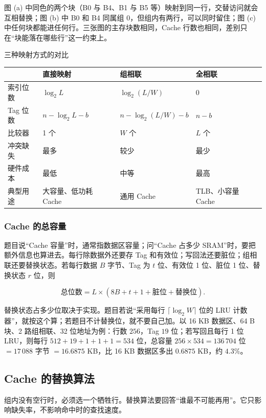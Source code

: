 图 (a) 中同色的两个块（B0 与 B4、B1 与 B5 等）映射到同一行，交替访问就会互相替换；图 (b) 中 B0 和 B4 同属组 0，但组内有两行，可以同时留住；图 (c) 中任何块都能进任何行。三张图的主存块数相同，Cache 行数也相同，差别只在“块能落在哪些行”这一约束上。

\begin{tablebox}{三种映射方式的对比}
\centering
\begin{tabularx}{\linewidth}{|p{2.1cm}|X|X|X|}
\hline
 & 直接映射 & 组相联 & 全相联 \\
\hline
索引位数 & \(\log_2 L\) & \(\log_2(L/W)\) & 0 \\
Tag 位数 & \(n-\log_2 L-b\) & \(n-\log_2(L/W)-b\) & \(n-b\) \\
比较器 & 1 个 & \(W\) 个 & \(L\) 个 \\
冲突缺失 & 最多 & 较少 & 最少 \\
硬件成本 & 最低 & 中等 & 最高 \\
典型用途 & 大容量、低功耗 Cache & 通用 Cache & TLB、小容量 Cache \\
\hline
\end{tabularx}
\end{tablebox}

\subsubsection*{Cache 的总容量}

题目说“Cache 容量”时，通常指数据区容量；问“Cache 占多少 SRAM”时，要把额外信息也算进去。每行除数据外还要存 Tag 和有效位；写回法还要脏位；组相联还要替换状态。若每行数据 \(B\) 字节、Tag 为 \(t\) 位、有效位 1 位、脏位 1 位、替换状态 \(r\) 位，则

\[
\text{总位数}=L\times(8B+t+1+\text{脏位}+\text{替换位}).
\]

替换状态占多少位取决于实现。题目若说“采用每行 \(\lceil\log_2 W\rceil\) 位的 LRU 计数器”，就按这个算；若题目不计替换位，就不要自己加。以 16 KB 数据区、64 B 块、2 路组相联、32 位地址为例：行数 \(256\)，Tag \(19\) 位；若写回且每行 1 位 LRU，则每行 \(512+19+1+1+1=534\) 位，总容量 \(256\times534=136\,704\) 位 \(=17\,088\) 字节 \(=16.6875\) KB，比 16 KB 数据区多出 \(0.6875\) KB，约 \(4.3\%\)。

\subsection{Cache 的替换算法}

组内没有空行时，必须选一个牺牲行。替换算法要回答“谁最不可能再用”。它只影响缺失率，不影响命中时的查找速度。

